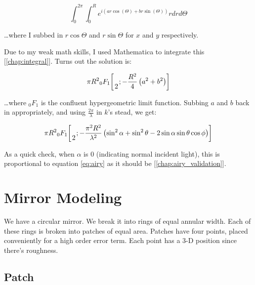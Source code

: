 \documentclass[etd,twoside,senior]{BYUPhys}
\newcommand*\pFqskip{8mu}
\newcommand*\pFq{\begingroup
        \catcode`\,\active
        \def ,{\mskip\pFqskip\relax}%
        \dopFq
}
\def\dopFq#1#2#3#4#5{%
        {}_{#1}F_{#2}\biggl[\genfrac..{0pt}{}{#3}{#4};#5\biggr]%
        \endgroup
}
\begin{document}
\begin{equation}\label{eq:integral1}
  \int_0^{2\pi}\int_0^R e^{i(ar\cos(\Theta)+br\sin(\Theta))} rdrd\Theta
\end{equation}

\ldots where I subbed in $r\cos\Theta$ and $r\sin\Theta$ for $x$ and $y$ respectively.

Due to my weak math skills, I used Mathematica to integrate this [\ref{chap:integral}]. Turns out the solution is:

\begin{equation}\label{eq:expected_refl}
  \pi R^2 \pFq{0}{1}{}{2}{-\frac{R^2}{4}\left(a^2+b^2\right)}
\end{equation}

\ldots where ${}_0 F_1$ is the confluent hypergeometric limit function. Subbing $a$ and $b$ back in appropriately, and using $\frac{2\pi}{\lambda}$ in $k$'s stead, we get:

\begin{equation}
  \pi R^2 \pFq{0}{1}{}{2}{-\frac{\pi^2 R^2}{\lambda^2}\left(\sin^2\alpha+\sin^2\theta-2\sin\alpha\sin\theta\cos\phi\right)}
\end{equation}

As a quick check, when $\alpha$ is 0 (indicating normal incident light), this is proportional to equation \ref{eq:airy} as it should be [\ref{chap:airy_validation}].







\section{Mirror Modeling} \label{section:mirror_modeling}

We have a circular mirror. We break it into rings of equal annular width. Each of these rings is broken into patches of equal area. Patches have four points, placed conveniently for a high order error term. Each point has a 3-D position since there's roughness.

\subsection{Patch} \label{sec:patch}
\end{document}
